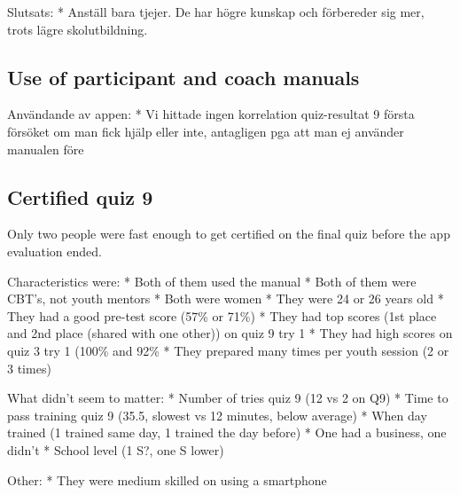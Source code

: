 Slutsats:
* Anställ bara tjejer. De har högre kunskap och förbereder sig mer, trots lägre skolutbildning.

\subsection{Use of participant and coach manuals}

Användande av appen:
* Vi hittade ingen korrelation quiz-resultat 9 första försöket om man fick hjälp eller inte, antagligen pga att man ej använder manualen före

\subsection{Certified quiz 9}
Only two people were fast enough to get certified on the final quiz before the app evaluation ended.

Characteristics were:
* Both of them used the manual
* Both of them were CBT's, not youth mentors
* Both were women
* They were 24 or 26 years old
* They had a good pre-test score (57\% or 71\%)
* They had top scores (1st place and 2nd place (shared with one other)) on quiz 9 try 1
* They had high scores on quiz 3 try 1 (100\% and 92\%
* They prepared many times per youth session (2 or 3 times)

What didn't seem to matter:
* Number of tries quiz 9 (12 vs 2 on Q9)
* Time to pass training quiz 9 (35.5, slowest vs 12 minutes, below average)
* When day trained (1 trained same day, 1 trained the day before)
* One had a business, one didn't
* School level (1 S?, one S lower)

Other:
* They were medium skilled on using a smartphone
